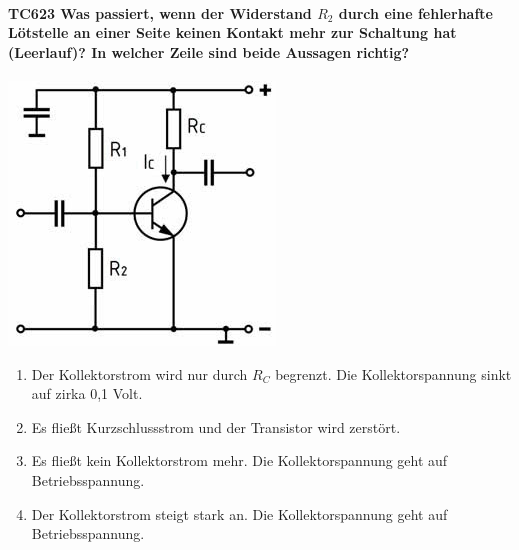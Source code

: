 \documentclass[8pt]{article}
\begin{document}
\begin{enumerate}
\begin{enumerate}[nolistsep,label=\Alph*]
{\begin{enumerate}[nolistsep,label=\Alph*]
\paragraph*{TC623 Was passiert, wenn der Widerstand $R_{2}$ durch eine fehlerhafte Lötstelle an einer Seite keinen Kontakt mehr zur Schaltung hat (Leerlauf)? In welcher Zeile sind beide Aussagen richtig?}
\begin{center}
	\begin{minipage}{\linewidth}
		\centering
		\includegraphics[scale=1.0]{pics/tc623_a.jpg}
	\end{minipage}
\end{center}
\begin{enumerate}[nolistsep,label=\Alph*]
\item Der Kollektorstrom wird nur durch $R_{C}$ begrenzt. Die Kollektorspannung sinkt auf zirka 0,1 Volt.
\item Es fließt Kurzschlussstrom und der Transistor wird zerstört.
\item Es fließt kein Kollektorstrom mehr. Die Kollektorspannung geht auf Betriebsspannung.
\item Der Kollektorstrom steigt stark an. Die Kollektorspannung geht auf Betriebsspannung.
\end{enumerate}


\end{enumerate}}
\end{enumerate}
\end{enumerate}
\end{document}
